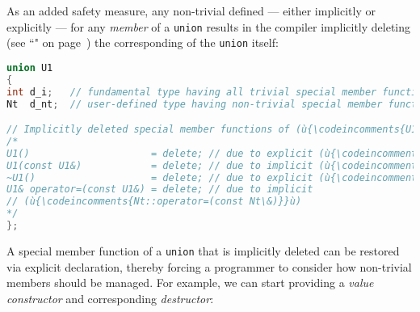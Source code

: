 \noindent As an added safety measure, any non-trivial  defined --- either implicitly or explicitly --- for any
\emph{member} of a \lstinline!union! results in the compiler implicitly
deleting (see %
``" on page~\pageref{deleted-functions}) the corresponding  of the \lstinline!union! itself:

\begin{lstlisting}[language=C++]
union U1
{
int d_i;   // fundamental type having all trivial special member functions
Nt  d_nt;  // user-defined type having non-trivial special member functions

// Implicitly deleted special member functions of (ù{\codeincomments{U1}}ù):
/*
U1()                     = delete; // due to explicit (ù{\codeincomments{Nt::Nt()}}ù)
U1(const U1&)            = delete; // due to implicit (ù{\codeincomments{Nt::Nt(const Nt\&)}}ù)
~U1()                    = delete; // due to explicit (ù{\codeincomments{Nt::}}ù)~(ù{\codeincomments{Nt()}}ù)
U1& operator=(const U1&) = delete; // due to implicit
// (ù{\codeincomments{Nt::operator=(const Nt\&)}}ù)
*/
};
\end{lstlisting}


A special member function of a \lstinline!union! that is implicitly deleted
can be restored via explicit declaration, thereby forcing a programmer
to consider how non-trivial members should be managed. For example,
we can start providing a \emph{value constructor} and corresponding
\emph{destructor}:


